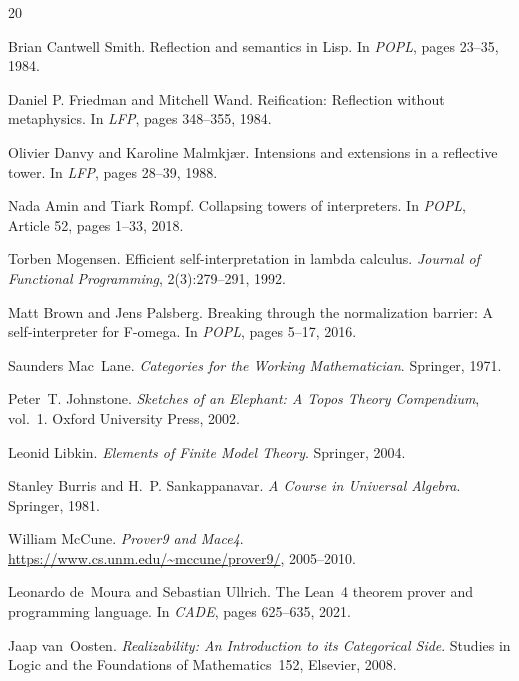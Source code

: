 \documentclass[sigconf,screen,review,anonymous]{acmart}
\theoremstyle{remark}
\begin{document}
\begin{thebibliography}{20}

Brian Cantwell Smith.
\newblock Reflection and semantics in {Lisp}.
\newblock In \emph{POPL}, pages 23--35, 1984.

Daniel P. Friedman and Mitchell Wand.
\newblock Reification: Reflection without metaphysics.
\newblock In \emph{LFP}, pages 348--355, 1984.

Olivier Danvy and Karoline Malmkj{\ae}r.
\newblock Intensions and extensions in a reflective tower.
\newblock In \emph{LFP}, pages 28--39, 1988.

Nada Amin and Tiark Rompf.
\newblock Collapsing towers of interpreters.
\newblock In \emph{POPL}, Article 52, pages 1--33, 2018.

Torben Mogensen.
\newblock Efficient self-interpretation in lambda calculus.
\newblock \emph{Journal of Functional Programming}, 2(3):279--291, 1992.

Matt Brown and Jens Palsberg.
\newblock Breaking through the normalization barrier: A self-interpreter for {F-omega}.
\newblock In \emph{POPL}, pages 5--17, 2016.

Saunders Mac~Lane.
\newblock \emph{Categories for the Working Mathematician}.
\newblock Springer, 1971.

Peter~T. Johnstone.
\newblock \emph{Sketches of an Elephant: A Topos Theory Compendium}, vol.~1.
\newblock Oxford University Press, 2002.

Leonid Libkin.
\newblock \emph{Elements of Finite Model Theory}.
\newblock Springer, 2004.

Stanley Burris and H.~P. Sankappanavar.
\newblock \emph{A Course in Universal Algebra}.
\newblock Springer, 1981.

William McCune.
\newblock \emph{Prover9 and Mace4}.
\newblock \url{https://www.cs.unm.edu/~mccune/prover9/}, 2005--2010.

Leonardo de~Moura and Sebastian Ullrich.
\newblock The {Lean}~4 theorem prover and programming language.
\newblock In \emph{CADE}, pages 625--635, 2021.

Jaap van~Oosten.
\newblock \emph{Realizability: An Introduction to its Categorical Side}.
\newblock Studies in Logic and the Foundations of Mathematics~152, Elsevier, 2008.


\end{thebibliography}
\end{document}
